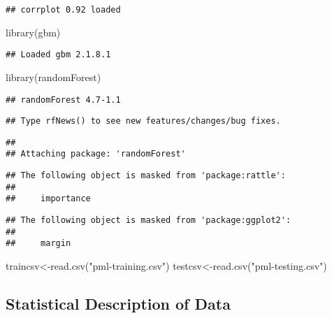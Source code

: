 \documentclass[
]{article}
\newenvironment{Shaded}{\begin{snugshade}}{\end{snugshade}}
\newcommand{\FunctionTok}[1]{\textcolor[rgb]{0.00,0.00,0.00}{#1}}
\newcommand{\NormalTok}[1]{#1}
\newcommand{\OtherTok}[1]{\textcolor[rgb]{0.56,0.35,0.01}{#1}}
\newcommand{\StringTok}[1]{\textcolor[rgb]{0.31,0.60,0.02}{#1}}
\begin{document}
\begin{verbatim}
## corrplot 0.92 loaded
\end{verbatim}

\begin{Shaded}
\begin{Highlighting}[]
\FunctionTok{library}\NormalTok{(gbm)}
\end{Highlighting}
\end{Shaded}

\begin{verbatim}
## Loaded gbm 2.1.8.1
\end{verbatim}

\begin{Shaded}
\begin{Highlighting}[]
\FunctionTok{library}\NormalTok{(randomForest)}
\end{Highlighting}
\end{Shaded}

\begin{verbatim}
## randomForest 4.7-1.1
\end{verbatim}

\begin{verbatim}
## Type rfNews() to see new features/changes/bug fixes.
\end{verbatim}

\begin{verbatim}
## 
## Attaching package: 'randomForest'
\end{verbatim}

\begin{verbatim}
## The following object is masked from 'package:rattle':
## 
##     importance
\end{verbatim}

\begin{verbatim}
## The following object is masked from 'package:ggplot2':
## 
##     margin
\end{verbatim}

\begin{Shaded}
\begin{Highlighting}[]
\NormalTok{traincsv}\OtherTok{\textless{}{-}}\FunctionTok{read.csv}\NormalTok{(}\StringTok{"pml{-}training.csv"}\NormalTok{)}
\NormalTok{testcsv}\OtherTok{\textless{}{-}}\FunctionTok{read.csv}\NormalTok{(}\StringTok{"pml{-}testing.csv"}\NormalTok{)}
\end{Highlighting}
\end{Shaded}

\hypertarget{statistical-description-of-data}{%
\subsection{Statistical Description of
Data}\label{statistical-description-of-data}}
\end{document}
